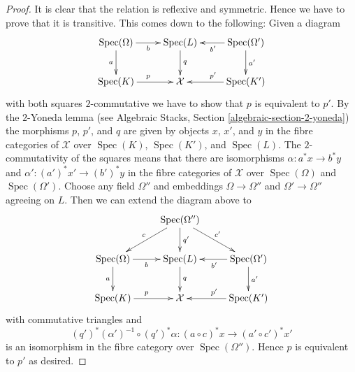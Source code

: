 \documentclass[10pt,a4paper]{amsart}
\theoremstyle{plain}
\theoremstyle{definition}
\theoremstyle{remark}
\numberwithin{equation}{subsection}
\def\Spec{\mathop{\mathrm{Spec}}}
\begin{document}
\begin{proof}
It is clear that the relation is reflexive and symmetric.
Hence we have to prove that it is transitive. This comes down
to the following: Given a diagram
$$
\xymatrix{
\Spec(\Omega) \ar[r]_b \ar[d]_a &
\Spec(L) \ar[d]^q & \Spec(\Omega') \ar[l]^{b'} \ar[d]^{a'} \\
\Spec(K) \ar[r]^p &
\mathcal{X} &
\Spec(K') \ar[l]_{p'}
}
$$
with both squares $2$-commutative we have to show that $p$ is equivalent to
$p'$. By the $2$-Yoneda lemma (see
Algebraic Stacks, Section \ref{algebraic-section-2-yoneda})
the morphisms $p$, $p'$, and $q$ are given by objects
$x$, $x'$, and $y$ in the fibre categories of $\mathcal{X}$ over
$\Spec(K)$, $\Spec(K')$, and $\Spec(L)$. The
$2$-commutativity of the squares means that there are isomorphisms
$\alpha : a^*x \to b^*y$ and $\alpha' : (a')^*x' \to (b')^*y$
in the fibre categories
of $\mathcal{X}$ over $\Spec(\Omega)$ and $\Spec(\Omega')$.
Choose any field $\Omega''$ and embeddings
$\Omega \to \Omega''$ and $\Omega' \to \Omega''$ agreeing on $L$.
Then we can extend the diagram above to
$$
\xymatrix{
& \Spec(\Omega'') \ar[ld]_c \ar[d]^{q'} \ar[rd]^{c'} \\
\Spec(\Omega) \ar[r]_b \ar[d]_a &
\Spec(L) \ar[d]^q & \Spec(\Omega') \ar[l]^{b'} \ar[d]^{a'} \\
\Spec(K) \ar[r]^p &
\mathcal{X} &
\Spec(K') \ar[l]_{p'}
}
$$
with commutative triangles and
$$
(q')^*(\alpha')^{-1} \circ (q')^*\alpha :
(a \circ c)^*x
\longrightarrow
(a' \circ c')^*x'
$$
is an isomorphism in the fibre category over $\Spec(\Omega'')$.
Hence $p$ is equivalent to $p'$ as desired.
\end{proof}
\end{document}
